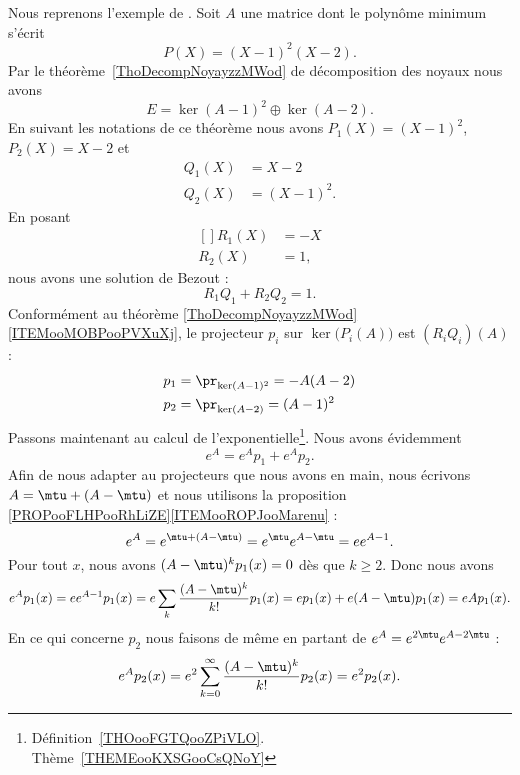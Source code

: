 Nous reprenons l'exemple de \cite{MneimneReduct}. Soit \( A\) une matrice dont le polynôme minimum s'écrit
\begin{equation}
	P(X)=(X-1)^2(X-2).
\end{equation}
Par le théorème~\ref{ThoDecompNoyayzzMWod} de décomposition des noyaux nous avons
\begin{equation}
	E=\ker(A-1)^2\oplus\ker(A-2).
\end{equation}
En suivant les notations de ce théorème nous avons \( P_1(X)=(X-1)^2\), \( P_2(X)=X-2\) et
\begin{subequations}
	\begin{align}
		Q_1(X) & =X-2      \\
		Q_2(X) & =(X-1)^2.
	\end{align}
\end{subequations}
En posant
\begin{equation}
	\begin{aligned}[]
		R_1(X) & =-X \\
		R_2(X) & =1,
	\end{aligned}
\end{equation}
nous avons une solution de Bezout :
\begin{equation}
	R_1Q_1+R_2Q_2=1.
\end{equation}
Conformément au théorème \ref{ThoDecompNoyayzzMWod}\ref{ITEMooMOBPooPVXuXj}, le projecteur \( p_i\) sur \( \ker\big( P_i(A) \big)\) est
\(  (R_iQ_i)(A)\) :
\begin{equation}
	\begin{aligned}[]
		p_1 & =\pr_{\ker(A-1)^2}=-A(A-2) \\
		p_2 & =\pr_{\ker(A-2)}=(A-1)^2
	\end{aligned}
\end{equation}
Passons maintenant au calcul de l'exponentielle\footnote{Définition~\ref{THOooFGTQooZPiVLO}. Thème~\ref{THEMEooKXSGooCsQNoY}}. Nous avons évidemment
\begin{equation}    \label{EQooVIOWooACVAoZ}
	e^A=e^Ap_1+e^Ap_2.
\end{equation}
Afin de nous adapter au projecteurs que nous avons en main, nous écrivons \( A=\mtu+(A-\mtu)\) et nous utilisons la proposition \ref{PROPooFLHPooRhLiZE}\ref{ITEMooROPJooMarenu} :
\begin{equation}
	e^{A}= e^{\mtu+(A-\mtu)}= e^{\mtu} e^{A-\mtu}=e e^{A-1}.
\end{equation}
Pour tout \( x\), nous avons \( (A-\mtu)^kp_1(x)=0\) dès que \( k\geq 2\). Donc nous avons
\begin{equation}
	e^{A}p_1(x)=e e^{A-1}p_1(x)=e\sum_k\frac{ (A-\mtu)^k }{ k! }p_1(x)=ep_1(x)+e(A-\mtu)p_1(x)=eAp_1(x).
\end{equation}
En ce qui concerne \( p_2\) nous faisons de même en partant de \(  e^{A}=  e^{2\mtu} e^{A-2\mtu}\) :
\begin{equation}
	e^{A}p_2(x)= e^{2}\sum_{k=0}^{\infty}\frac{ (A-\mtu)^k }{ k! }p_2(x)=e^2p_2(x).
\end{equation}

